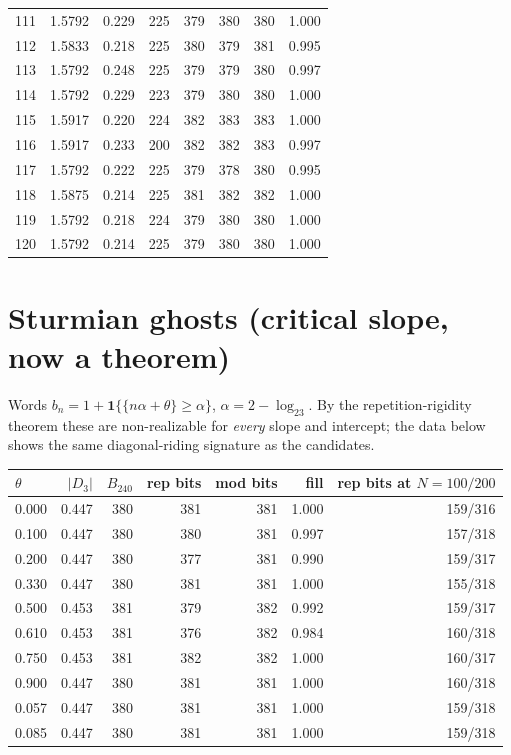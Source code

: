 \documentclass[10pt]{article}
\begin{document}
\begin{longtable}{rrrrrrrr}
111 & 1.5792 & 0.229 & 225 & 379 & 380 & 380 & 1.000\\
112 & 1.5833 & 0.218 & 225 & 380 & 379 & 381 & 0.995\\
113 & 1.5792 & 0.248 & 225 & 379 & 379 & 380 & 0.997\\
114 & 1.5792 & 0.229 & 223 & 379 & 380 & 380 & 1.000\\
115 & 1.5917 & 0.220 & 224 & 382 & 383 & 383 & 1.000\\
116 & 1.5917 & 0.233 & 200 & 382 & 382 & 383 & 0.997\\
117 & 1.5792 & 0.222 & 225 & 379 & 378 & 380 & 0.995\\
118 & 1.5875 & 0.214 & 225 & 381 & 382 & 382 & 1.000\\
119 & 1.5792 & 0.218 & 224 & 379 & 380 & 380 & 1.000\\
120 & 1.5792 & 0.214 & 225 & 379 & 380 & 380 & 1.000\\
\bottomrule
\end{longtable}

\section{Sturmian ghosts (critical slope, now a theorem)}
Words $b_n=1+\mathbf 1\{\{n\alpha+\theta\}\ge\alpha\}$,
$\alpha=2-\log_23$. By the repetition-rigidity theorem these are
non-realizable for \emph{every} slope and intercept; the data below shows
the same diagonal-riding signature as the candidates.\medskip

\begin{longtable}{lrrrrrr}
\toprule
$\theta$ & $|D_3|$ & $B_{240}$ & rep bits & mod bits & fill & rep bits at $N{=}100/200$\\
\midrule\endhead
0.000 & 0.447 & 380 & 381 & 381 & 1.000 & 159/316\\
0.100 & 0.447 & 380 & 380 & 381 & 0.997 & 157/318\\
0.200 & 0.447 & 380 & 377 & 381 & 0.990 & 159/317\\
0.330 & 0.447 & 380 & 381 & 381 & 1.000 & 155/318\\
0.500 & 0.453 & 381 & 379 & 382 & 0.992 & 159/317\\
0.610 & 0.453 & 381 & 376 & 382 & 0.984 & 160/318\\
0.750 & 0.453 & 381 & 382 & 382 & 1.000 & 160/317\\
0.900 & 0.447 & 380 & 381 & 381 & 1.000 & 160/318\\
0.057 & 0.447 & 380 & 381 & 381 & 1.000 & 159/318\\
0.085 & 0.447 & 380 & 381 & 381 & 1.000 & 159/318\\
\bottomrule
\end{longtable}
\end{document}
